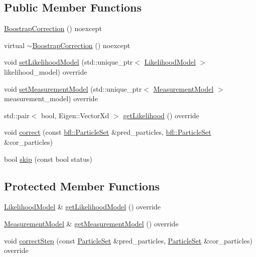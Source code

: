 \subsection*{Public Member Functions}
\begin{DoxyCompactItemize}
\item 
\mbox{\hyperlink{classbfl_1_1BoostrapCorrection_a0745f5bb495d8afea6cbbbf426ab81ed}{Boostrap\+Correction}} () noexcept
\item 
virtual \mbox{\hyperlink{classbfl_1_1BoostrapCorrection_af99836ae1156168417cac182000cb886}{$\sim$\+Boostrap\+Correction}} () noexcept
\item 
void \mbox{\hyperlink{classbfl_1_1BoostrapCorrection_a75d770c17ac4142833c926e9e6dc32db}{set\+Likelihood\+Model}} (std\+::unique\+\_\+ptr$<$ \mbox{\hyperlink{classbfl_1_1LikelihoodModel}{Likelihood\+Model}} $>$ likelihood\+\_\+model) override
\item 
void \mbox{\hyperlink{classbfl_1_1BoostrapCorrection_af6e02e5d6e6426cbee2825a77c79da43}{set\+Measurement\+Model}} (std\+::unique\+\_\+ptr$<$ \mbox{\hyperlink{classbfl_1_1MeasurementModel}{Measurement\+Model}} $>$ measurement\+\_\+model) override
\item 
std\+::pair$<$ bool, Eigen\+::\+Vector\+Xd $>$ \mbox{\hyperlink{classbfl_1_1BoostrapCorrection_a18ad4ccfd9d7cf008011cbc79a0cea8f}{get\+Likelihood}} () override
\item 
void \mbox{\hyperlink{classbfl_1_1PFCorrection_a560666b2e7566a846cb4ce4684e195e0}{correct}} (const \mbox{\hyperlink{classbfl_1_1ParticleSet}{bfl\+::\+Particle\+Set}} \&pred\+\_\+particles, \mbox{\hyperlink{classbfl_1_1ParticleSet}{bfl\+::\+Particle\+Set}} \&cor\+\_\+particles)
\item 
bool \mbox{\hyperlink{classbfl_1_1PFCorrection_ab25e625ea12fe257e0eb85d465835e62}{skip}} (const bool status)
\end{DoxyCompactItemize}
\subsection*{Protected Member Functions}
\begin{DoxyCompactItemize}
\item 
\mbox{\hyperlink{classbfl_1_1LikelihoodModel}{Likelihood\+Model}} \& \mbox{\hyperlink{classbfl_1_1BoostrapCorrection_aae2f5698ba37895b6193f51441f96f38}{get\+Likelihood\+Model}} () override
\item 
\mbox{\hyperlink{classbfl_1_1MeasurementModel}{Measurement\+Model}} \& \mbox{\hyperlink{classbfl_1_1BoostrapCorrection_a4d11bb3e7e27dcd62bb7e1b5df83c8db}{get\+Measurement\+Model}} () override
\item 
void \mbox{\hyperlink{classbfl_1_1BoostrapCorrection_a493eed345120c5babb0f3591d9c7c854}{correct\+Step}} (const \mbox{\hyperlink{classbfl_1_1ParticleSet}{Particle\+Set}} \&pred\+\_\+particles, \mbox{\hyperlink{classbfl_1_1ParticleSet}{Particle\+Set}} \&cor\+\_\+particles) override
\end{DoxyCompactItemize}
